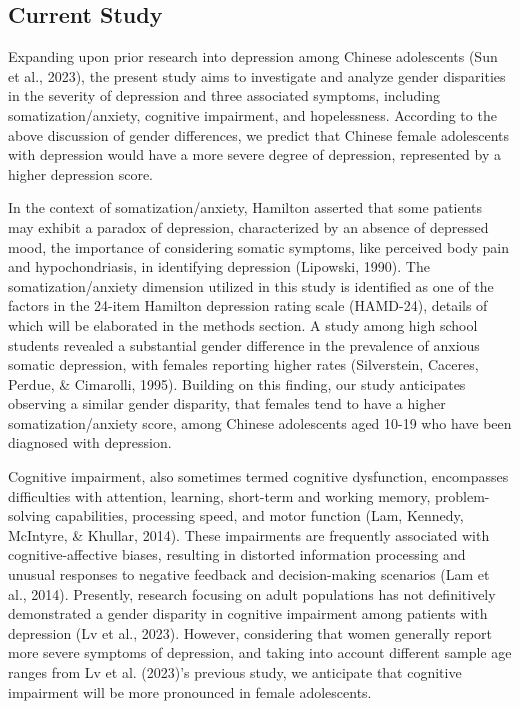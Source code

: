\documentclass[
  man,floatsintext]{apa6}
\begin{document}
\hypertarget{current-study}{%
\subsection{Current Study}\label{current-study}}

Expanding upon prior research into depression among Chinese adolescents (Sun et al., 2023), the present study aims to investigate and analyze gender disparities in the severity of depression and three associated symptoms, including somatization/anxiety, cognitive impairment, and hopelessness. According to the above discussion of gender differences, we predict that Chinese female adolescents with depression would have a more severe degree of depression, represented by a higher depression score.

In the context of somatization/anxiety, Hamilton asserted that some patients may exhibit a paradox of depression, characterized by an absence of depressed mood, the importance of considering somatic symptoms, like perceived body pain and hypochondriasis, in identifying depression (Lipowski, 1990). The somatization/anxiety dimension utilized in this study is identified as one of the factors in the 24-item Hamilton depression rating scale (HAMD-24), details of which will be elaborated in the methods section. A study among high school students revealed a substantial gender difference in the prevalence of anxious somatic depression, with females reporting higher rates (Silverstein, Caceres, Perdue, \& Cimarolli, 1995). Building on this finding, our study anticipates observing a similar gender disparity, that females tend to have a higher somatization/anxiety score, among Chinese adolescents aged 10-19 who have been diagnosed with depression.

Cognitive impairment, also sometimes termed cognitive dysfunction, encompasses difficulties with attention, learning, short-term and working memory, problem-solving capabilities, processing speed, and motor function (Lam, Kennedy, McIntyre, \& Khullar, 2014). These impairments are frequently associated with cognitive-affective biases, resulting in distorted information processing and unusual responses to negative feedback and decision-making scenarios (Lam et al., 2014). Presently, research focusing on adult populations has not definitively demonstrated a gender disparity in cognitive impairment among patients with depression (Lv et al., 2023). However, considering that women generally report more severe symptoms of depression, and taking into account different sample age ranges from Lv et al. (2023)'s previous study, we anticipate that cognitive impairment will be more pronounced in female adolescents.
\end{document}
